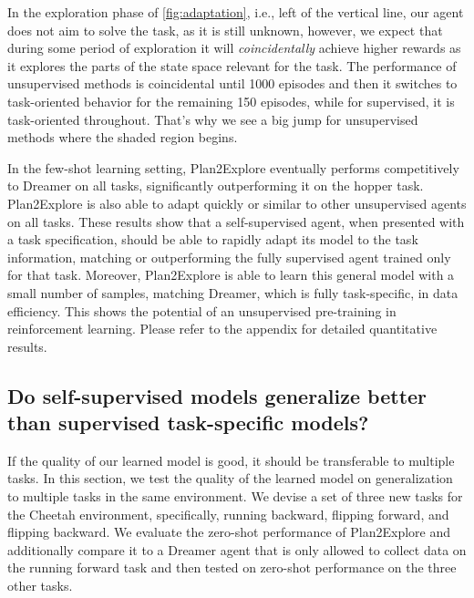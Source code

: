 \documentclass{article}
\begin{document}
%

In the exploration phase of \cref{fig:adaptation}, i.e., left of the vertical line, our agent does not aim to solve the task, as it is still unknown, however, we expect that during some period of exploration it will \textit{coincidentally} achieve higher rewards as it explores the parts of the state space relevant for the task. The performance of unsupervised methods is coincidental until 1000 episodes and then it switches to task-oriented behavior for the remaining 150 episodes, while for supervised, it is task-oriented throughout. That's why we see a big jump for unsupervised methods where the shaded region begins.
%
%

In the few-shot learning setting, Plan2Explore eventually performs competitively to Dreamer on all tasks, significantly outperforming it on the hopper task. Plan2Explore is also able to adapt quickly or similar to other unsupervised agents on all tasks. These results show that a self-supervised agent, when presented with a task specification, should be able to rapidly adapt its model to the task information, matching or outperforming the fully supervised agent trained only for that task. Moreover, Plan2Explore is able to learn this general model with a small number of samples, matching Dreamer, which is fully task-specific, in data efficiency.
This shows the potential of an unsupervised pre-training in reinforcement learning. Please refer to the appendix for detailed quantitative results.

%


%

%

%
%

\subsection{Do self-supervised models generalize better than supervised task-specific models?}
%
If the quality of our learned model is good, it should be transferable to multiple tasks. In this section, we test the quality of the learned model on generalization to multiple tasks in the same environment. %
We devise a set of three new tasks for the Cheetah environment, specifically, running backward, flipping forward, and flipping backward. %
We evaluate the zero-shot performance of Plan2Explore and additionally compare it to a Dreamer agent that is only allowed to collect data on the running forward task and then tested on zero-shot performance on the three other tasks. %
\end{document}
